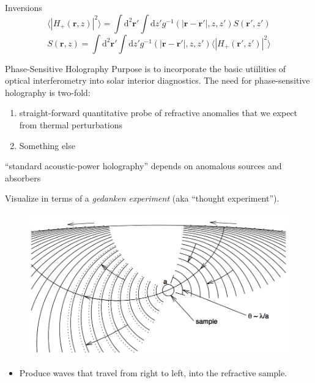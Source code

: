 \documentclass{beamer}
\begin{document}
\begin{frame}{Inversions}
    $$ \langle|H_{+}(\mathbf{r},z)|^{2}\rangle =
    \int\textrm{d}^{2}\mathbf{r}'\int\textrm{d}z'g^{-1}
    (|\mathbf{r}-\mathbf{r}'|,z,z')S(\mathbf{r}',z') $$
    $$ S(\mathbf{r},z) = \int\textrm{d}^{2}\mathbf{r}'
        \int\textrm{d}z'g^{-1}(|\mathbf{r}-\mathbf{r}'|,z,z')
        \langle |H_{+}(\mathbf{r}',z')|^{2}  \rangle $$
\end{frame}

\begin{frame}{Phase-Sensitive Holography}
    Purpose is to incorporate the basic utiilities of optical
    interferometry into solar interior diagnostics.
    The need for phase-sensitive holography is two-fold:
    \begin{enumerate}
        \item straight-forward quantitative probe of refractive anomalies
            that we expect from thermal perturbations
        \item Something else
    \end{enumerate}
    ``standard acoustic-power holography'' depends on anomalous sources
    and absorbers
\end{frame}

\begin{frame}{Visualize in terms of a
    \emph{gedanken experiment} (aka ``thought experiment'').}
    \vspace{-0.25cm}
    \begin{figure}
        \includegraphics[width=\textwidth]{fig_6.png}
    \end{figure}
    \begin{itemize}
        \item Produce waves that travel from right to left, into the
            refractive sample.
    \end{itemize}
\end{frame}
\end{document}
